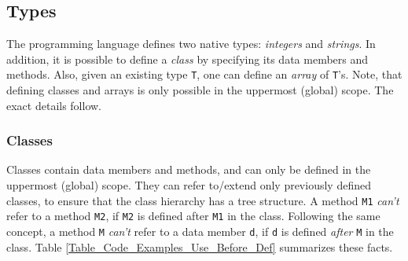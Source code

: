 \documentclass{article}
\begin{document}
\subsection{Types}
The \plname programming language defines two native types: \textit{integers} and \textit{strings}.
In addition, it is possible to define a \textit{class} by specifying its data members and methods.
Also, given an existing type \verb"T", one can define an \textit{array} of \verb"T"'s.
Note, that defining classes and arrays is only possible in the uppermost (global) scope.
The exact details follow.
\subsubsection{Classes}
\label{subsubsection_Classes}
Classes contain data members and methods,
and can only be defined in the uppermost (global) scope.
They can refer to/extend only previously defined classes,
to ensure that the class hierarchy has a tree structure.
A method \verb"M1" \textit{can't} refer to a method \verb"M2",
if \verb"M2" is defined after \verb"M1" in the class.
Following the same concept, %
a method \verb"M" \textit{can't} refer to a data member \verb"d",
if \verb"d" is defined \textit{after} \verb"M" in the class.
Table \ref{Table_Code_Examples_Use_Before_Def} summarizes these facts.
\end{document}
